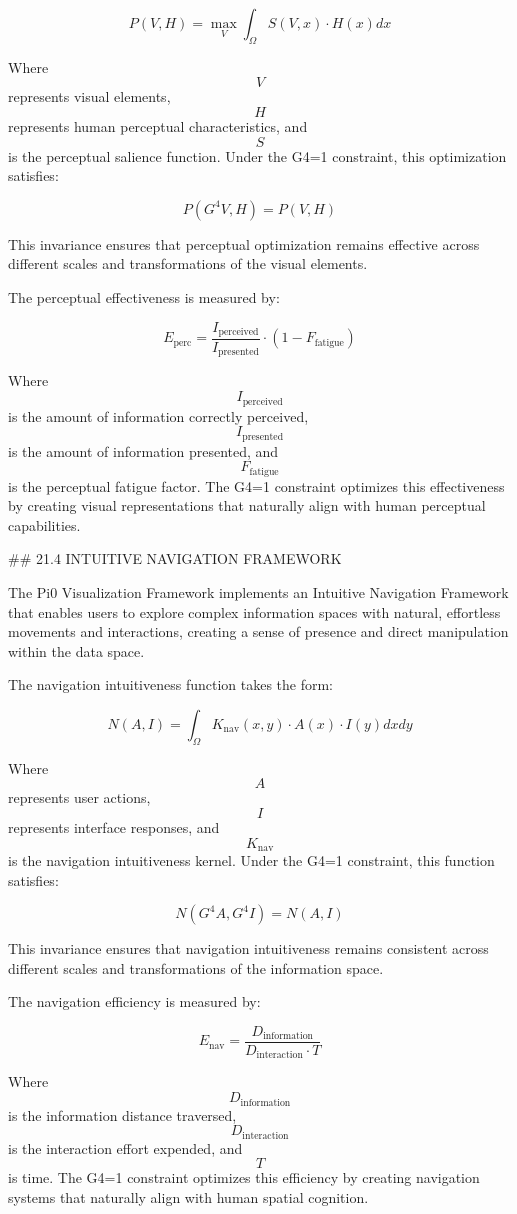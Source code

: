 $$ P(V, H) = \max_V \int_{\Omega} S(V, x) \cdot H(x) dx $$

Where $$ V $$ represents visual elements, $$ H $$ represents human perceptual characteristics, and $$ S $$ is the perceptual salience function. Under the G4=1 constraint, this optimization satisfies:

$$ P(G^4 V, H) = P(V, H) $$

This invariance ensures that perceptual optimization remains effective across different scales and transformations of the visual elements.

The perceptual effectiveness is measured by:

$$ E_{\text{perc}} = \frac{I_{\text{perceived}}}{I_{\text{presented}}} \cdot (1 - F_{\text{fatigue}}) $$

Where $$ I_{\text{perceived}} $$ is the amount of information correctly perceived, $$ I_{\text{presented}} $$ is the amount of information presented, and $$ F_{\text{fatigue}} $$ is the perceptual fatigue factor. The G4=1 constraint optimizes this effectiveness by creating visual representations that naturally align with human perceptual capabilities.

## 21.4 INTUITIVE NAVIGATION FRAMEWORK

The Pi0 Visualization Framework implements an Intuitive Navigation Framework that enables users to explore complex information spaces with natural, effortless movements and interactions, creating a sense of presence and direct manipulation within the data space.

The navigation intuitiveness function takes the form:

$$ N(A, I) = \int_{\Omega} K_{\text{nav}}(x, y) \cdot A(x) \cdot I(y) dx dy $$

Where $$ A $$ represents user actions, $$ I $$ represents interface responses, and $$ K_{\text{nav}} $$ is the navigation intuitiveness kernel. Under the G4=1 constraint, this function satisfies:

$$ N(G^4 A, G^4 I) = N(A, I) $$

This invariance ensures that navigation intuitiveness remains consistent across different scales and transformations of the information space.

The navigation efficiency is measured by:

$$ E_{\text{nav}} = \frac{D_{\text{information}}}{D_{\text{interaction}} \cdot T} $$

Where $$ D_{\text{information}} $$ is the information distance traversed, $$ D_{\text{interaction}} $$ is the interaction effort expended, and $$ T $$ is time. The G4=1 constraint optimizes this efficiency by creating navigation systems that naturally align with human spatial cognition.

